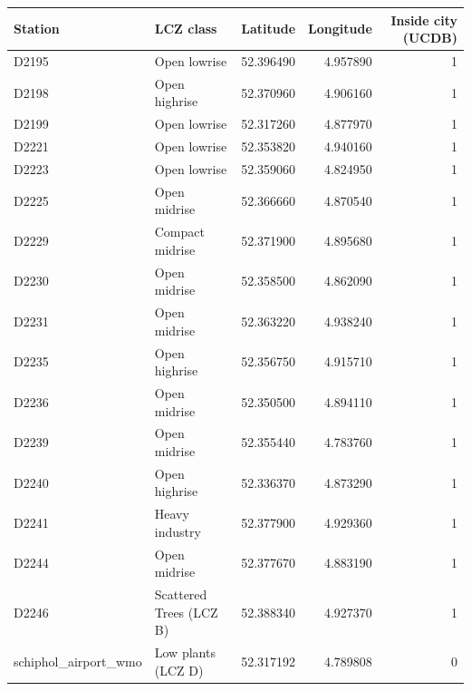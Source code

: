 \begin{tabular}{llrrr}
\toprule
Station & LCZ class & Latitude & Longitude & Inside city (UCDB) \\
\midrule
D2195 & Open lowrise & 52.396490 & 4.957890 & 1 \\
D2198 & Open highrise & 52.370960 & 4.906160 & 1 \\
D2199 & Open lowrise & 52.317260 & 4.877970 & 1 \\
D2221 & Open lowrise & 52.353820 & 4.940160 & 1 \\
D2223 & Open lowrise & 52.359060 & 4.824950 & 1 \\
D2225 & Open midrise & 52.366660 & 4.870540 & 1 \\
D2229 & Compact midrise & 52.371900 & 4.895680 & 1 \\
D2230 & Open midrise & 52.358500 & 4.862090 & 1 \\
D2231 & Open midrise & 52.363220 & 4.938240 & 1 \\
D2235 & Open highrise & 52.356750 & 4.915710 & 1 \\
D2236 & Open midrise & 52.350500 & 4.894110 & 1 \\
D2239 & Open midrise & 52.355440 & 4.783760 & 1 \\
D2240 & Open highrise & 52.336370 & 4.873290 & 1 \\
D2241 & Heavy industry & 52.377900 & 4.929360 & 1 \\
D2244 & Open midrise & 52.377670 & 4.883190 & 1 \\
D2246 & Scattered Trees (LCZ B) & 52.388340 & 4.927370 & 1 \\
schiphol_airport_wmo & Low plants (LCZ D) & 52.317192 & 4.789808 & 0 \\
\bottomrule
\end{tabular}
